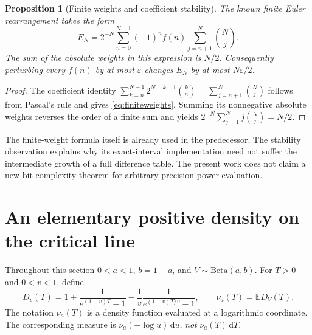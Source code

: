 \documentclass[11pt]{article}
\numberwithin{equation}{section}
\newtheorem{proposition}[theorem]{Proposition}
\theoremstyle{definition}\newtheorem{definition}[theorem]{Definition}
\theoremstyle{remark}\newtheorem{remark}[theorem]{Remark}
\newcommand{\dd}{\,\mathrm d}
\newcommand{\E}{\mathbb E}
\begin{document}
\begin{proposition}[Finite weights and coefficient stability]\label{prop:weights}
The known finite Euler rearrangement takes the form
\begin{equation}\label{eq:finiteweights}
 E_N=2^{-N}\sum_{n=0}^{N-1}(-1)^nf(n)
                   \sum_{j=n+1}^N\binom Nj.
\end{equation}
The sum of the absolute weights in this expression is $N/2$.
Consequently perturbing every $f(n)$ by at most $\varepsilon$ changes
$E_N$ by at most $N\varepsilon/2$.
\end{proposition}
\begin{proof}
The coefficient identity
$\sum_{k=n}^{N-1}2^{N-k-1}\binom kn=\sum_{j=n+1}^N\binom Nj$
follows from Pascal's rule and gives \eqref{eq:finiteweights}.
Summing its nonnegative absolute weights reverses the order of a
finite sum and yields
$2^{-N}\sum_{j=1}^Nj\binom Nj=N/2$.
\end{proof}
The finite-weight formula itself is already used in the predecessor.
The stability observation explains why its exact-interval implementation
need not suffer the intermediate growth of a full difference table.
The present work does not claim a new bit-complexity theorem for
arbitrary-precision power evaluation.

\section{An elementary positive density on the critical line}
\label{sec:density}
Throughout this section $0<a<1$, $b=1-a$, and $V\sim\mathrm{Beta}(a,b)$.
For $T>0$ and $0<v<1$, define
\begin{equation}\label{eq:Dv}
 D_v(T)=1+\frac1{e^{(1-v)T}-1}
       -\frac1v\frac1{e^{(1-v)T/v}-1},\qquad
 \nu_a(T)=\E D_V(T).
\end{equation}
The notation $\nu_a(T)$ is a density function evaluated at a logarithmic
coordinate. The corresponding measure is
$\nu_a(-\log u)\dd u$, \emph{not} $\nu_a(T)\dd T$.
\end{document}
